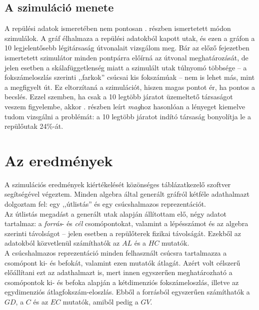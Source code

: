     \subsection{A szimuláció menete}
    A repülési adatok ismeretében nem pontosan . részben ismertetett módon szimulálok. A gráf élhalmaza a repülési adatokból kapott utak, és ezen a gráfon a 10 legjelentősebb légitársaság útvonalait vizsgálom meg. Bár az előző fejezetben ismertetett szimulátor minden pontpárra előírná az útvonal meghatározását, de jelen esetben a skálafüggetlenség miatt a szimulált utak túlnyomó többsége -- a fokszámeloszlás szerinti ,,farkok'' csúcsai kis fokszámúak -- nem is lehet más, mint a megfigyelt út. Ez eltorzítaná a szimulációt, hiszen magas pontot ér, ha pontos a becslés. Ezzel szemben, ha csak a 10 legtöbb járatot üzemeltető társaságot veszem figyelembe, akkor . részben leírt \textit{mag}hoz hasonlóan a lényeget kiemelve tudom vizsgálni a problémát: a 10 legtöbb járatot indító társaság bonyolítja le a repülőutak 24\%-át.

  \section{Az eredmények}
  A szimulációs eredmények kiértékelését közönséges táblázatkezelő szoftver segítségével végeztem. Minden algebra által generált gráfról kétféle adathalmazt dolgoztam fel: egy ,,útlistás'' és egy csúcshalmazos reprezentációt.\\

  Az útlistás megadást a generált utak alapján állítottam elő, négy adatot tartalmaz: a \textit{forrás}- és \textit{cél} csomópontokat, valamint a lépésszámot és az algebra szerinti távolságot -- jelen esetben a repülőterek fizikai távolságát. Ezekből az adatokból közvetlenül számíthatók az $AL$ és a $HC$ mutatók.\\

  A csúcshalmazos reprezentáció minden felhasznált csúcsra tartalmazza a csomópont ki- és befokát, valamint ezen mutatók átlagát. Azért volt célszerű előállítani ezt az adathalmazt is, mert innen egyszerűen meghatározható a csomópontok ki- és befoka alapján a kétdimenziós fokszámeloszlás, illetve az egydimenziós átlagfokszám-eloszlás. Ebből a forrásból egyszerűen számíthatók a $GD$, a $C$ és az $EC$ mutatók, amiből pedig a $GV$.\\

